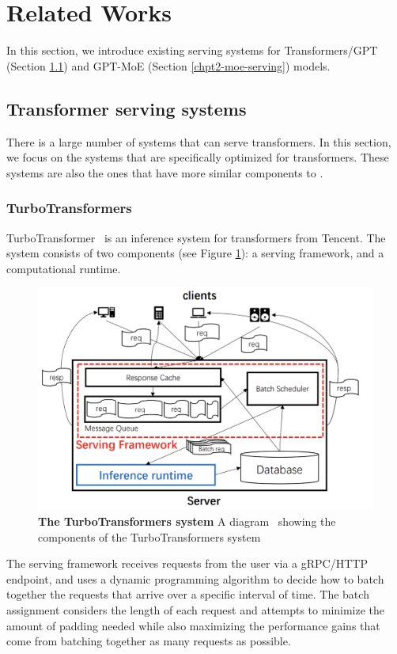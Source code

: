 \section{Related Works}\label{related-works}
In this section, we introduce existing serving systems for Transformers/GPT (Section \ref{transformer-serving}) and GPT-MoE (Section \ref{chpt2-moe-serving}) models.

\subsection{Transformer serving systems}\label{transformer-serving}
There is a large number of systems that can serve transformers. In this section, we focus on the systems that are specifically optimized for transformers. These systems are also the ones that have more similar components to \Project.

\subsubsection{TurboTransformers}
TurboTransformer~\cite{turbo_transformers} is an inference system for transformers from Tencent. The system consists of two components (see Figure \ref{fig:turbo-transformers}): a serving framework, and a computational runtime.

\begin{figure}[H]
    \centering
    \includegraphics[width=0.6\linewidth]{figures/turbo_transformers.png}
    \caption{\textbf{The TurboTransformers system} A diagram~\cite{fastermoe} showing the components of the TurboTransformers system}
    \label{fig:turbo-transformers}
\end{figure}

The serving framework receives requests from the user via a gRPC/HTTP endpoint, and uses a dynamic programming algorithm to decide how to batch together the requests that arrive over a specific interval of time. The batch assignment considers the length of each request and attempts to minimize the amount of padding needed while also maximizing the performance gains that come from batching together as many requests as possible. 

